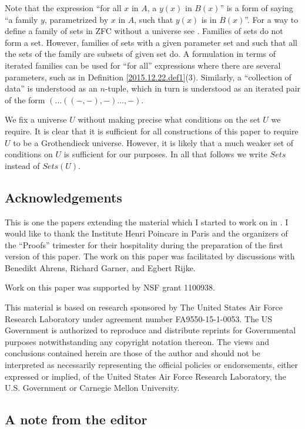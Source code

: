 \documentclass[12pt]{amsart}
\numberwithin{proposition}{subsection}
\begin{document}
Note that the expression ``for all $x$ in $A$, a $y(x)$ in $B(x)$'' is a form
of saying ``a family $y$, parametrized by $x$ in $A$, such that $y(x)$ is in
$B(x)$''. For a way to define a family of sets in ZFC without a universe
see \cite[Remark 3.9]{fromunivwithPiI}. Families of sets do not form a
set. However, families of sets with a given parameter set and such that all the
sets of the family are subsets of given set do. A formulation in terms of
iterated families can be used for ``for all'' expressions where there are
several parameters, such as in Definition \ref{2015.12.22.def1}(3). Similarly, a
``collection of data'' is understood as an $n$-tuple, which in turn is understood as
an iterated pair of the form $(\dots((-,-),-)\dots,-)$.

We fix a universe $U$ without making precise what conditions on the set $U$ we
require. It is clear that it is sufficient for all constructions of this paper
to require $U$ to be a Grothendieck universe. However, it is likely that a much
weaker set of conditions on $U$ is sufficient for our purposes. In all that
follows we write $Sets$ instead of $Sets(U)$.

\subsection{Acknowledgements}

This is one the papers extending the material which I started to work on in
\cite{NTS}. I would like to thank the Institute Henri Poincare in Paris and the
organizers of the ``Proofs'' trimester for their hospitality during the
preparation of the first version of this paper. The work on this paper was
facilitated by discussions with Benedikt Ahrens, Richard Garner, and Egbert
Rijke.

Work on this paper was supported by NSF grant 1100938.

This material is based on research sponsored by The United States Air
  Force Research Laboratory under agreement number FA9550-15-1-0053. The US
  Government is authorized to reproduce and distribute reprints for
  Governmental purposes notwithstanding any copyright notation thereon.
The views and conclusions contained herein are those of the author and should
not be interpreted as necessarily representing the official policies or
endorsements, either expressed or implied, of the United States Air Force
Research Laboratory, the U.S. Government or Carnegie Mellon University.

\subsection{A note from the editor}
\end{document}
